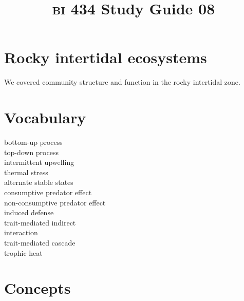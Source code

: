 \documentclass[letterpaper]{tufte-handout}
\title{{\scshape bi} 434 Study Guide 08}
\date{} %
\begin{document}
\maketitle	%

\section*{Rocky intertidal ecosystems}

We covered community structure and function in the rocky intertidal zone.

\section*{Vocabulary}

\vspace{-1\baselineskip}
\begin{multicols}{2}
bottom-up process \\
top-down process \\
intermittent upwelling \\
thermal stress \\
alternate stable states \\
consumptive predator effect \\
non-consumptive predator effect \\
induced defense \\
trait-mediated indirect\\ \hspace*{0.5em} interaction \\
trait-mediated cascade \\
trophic heat 
\end{multicols}

\section*{Concepts}
\end{document}
